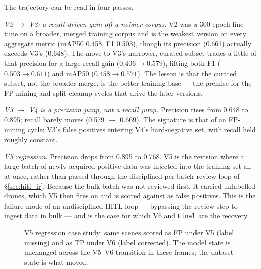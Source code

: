 \documentclass[12pt,a4paper,oneside,openright]{book}
\begin{document}
The trajectory can be read in four passes.

\emph{V2 $\to$ V3: a recall-driven gain off a noisier corpus.} V2 was a 300-epoch fine-tune on a broader, merged training corpus and is the weakest version on every aggregate metric (mAP50 0.458, F1 0.503), though its precision (0.661) actually exceeds V3's (0.648). The move to V3's narrower, curated subset trades a little of that precision for a large recall gain ($0.406 \to 0.579$), lifting both F1 ($0.503 \to 0.611$) and mAP50 ($0.458 \to 0.571$). The lesson is that the curated subset, not the broader merge, is the better training base --- the premise for the FP-mining and split-cleanup cycles that drive the later versions.

\emph{V3 $\to$ V4 is a precision jump, not a recall jump.} Precision rises from 0.648 to 0.895; recall barely moves (0.579 $\to$ 0.669). The signature is that of an FP-mining cycle: V3's false positives entering V4's hard-negative set, with recall held roughly constant.

\emph{V5 regression.} Precision drops from 0.895 to 0.768. V5 is the revision where a large batch of newly acquired positive data was injected into the training set all at once, rather than passed through the disciplined per-batch review loop of \S\ref{sec:hitl_ir}. Because the bulk batch was not reviewed first, it carried unlabelled drones, which V5 then fires on and is scored against as false positives. This is the failure mode of an undisciplined HITL loop --- bypassing the review step to ingest data in bulk --- and is the case for which V6 and \texttt{Final} are the recovery.

\begin{figure}[htbp]
    \centering
    \caption{V5 regression case study: same scenes scored as FP under V5 (label missing) and as TP under V6 (label corrected). The model state is unchanged across the V5--V6 transition in these frames; the dataset state is what moved.}
    \label{fig:v5_regression}
\end{figure}
\end{document}
